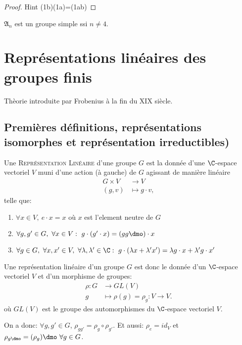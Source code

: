 \begin{proof}
	Hint (1b)(1a)=(1ab)
\end{proof}

\begin{theorem}[Galois]
	$\mathfrak{A}_n$ est un groupe simple ssi $n\neq 4$.
\end{theorem}

\chapter{Représentations linéaires des groupes finis}

Thèorie introduite par Frobenius à la fin du XIX siècle.

\section{Premières définitions, représentations isomorphes et représentation irreductibles)} %
\label{sec:premieres_definitions_représentations_yep_isomorphisms_et_rep_iuductis}

\begin{definition}
	Une \textsc{Représentation Linéaire} d'une groupe $G$ est la donnée d'une $\C$-espace vectoriel $V$ muni d'une action (à gauche) de $G$ agissant de manière linéaire
	\begin{align*}
		G\times V & \rightarrow V \\
		(g,v) & \mapsto g\cdot v,		
	\end{align*}
	telle que:
	\begin{enumerate}
		\item $\forall x\in V,\ e\cdot x=x$ où $x$ est l'element neutre de $G$
		\item $\forall g, g' \in G,\ \forall x\in V:\ g\cdot (g'\cdot x)=(gg\dmo)\cdot x$
		\item $\forall g\in G,\ \forall x,x'\in V,\ \forall \lambda,\lambda'\in\C:\ g\cdot(\lambda x+\lambda'x')=\lambda g\cdot x+\lambda' g\cdot x'$
	\end{enumerate}
\end{definition}

\begin{definition}
Une représentation linéaire d'un groupe $G$ est donc le donnée d'un $\C$-espace vectoriel $V$ et d'un morphisme de groupes:
\begin{align*}
	\rho:G &\rightarrow GL(V)\\
	g &\mapsto \rho(g)=\rho_g:V\rightarrow V.	
\end{align*}                
où $GL(V)$ est le groupe des automorphismes du $\C$-espace vectoriel $V$.

On a donc: $\forall g,g'\in G$, $\rho_{gg'}=\rho_g\circ \rho_{g'}$. Et aussi: $\rho_e=id_V$ et $\rho_{g\dmo}=(\rho_g)\dmo\ \forall g\in G$.
\end{definition}

